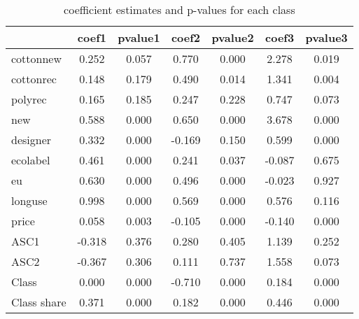 \begin{table}[ht]
\centering
\begin{tabular}{lcccccc}
  \hline
 & coef1 & pvalue1 & coef2 & pvalue2 & coef3 & pvalue3 \\ 
  \hline
cottonnew & 0.252 & 0.057 & 0.770 & 0.000 & 2.278 & 0.019 \\ 
  cottonrec & 0.148 & 0.179 & 0.490 & 0.014 & 1.341 & 0.004 \\ 
  polyrec & 0.165 & 0.185 & 0.247 & 0.228 & 0.747 & 0.073 \\ 
  new & 0.588 & 0.000 & 0.650 & 0.000 & 3.678 & 0.000 \\ 
  designer & 0.332 & 0.000 & -0.169 & 0.150 & 0.599 & 0.000 \\ 
  ecolabel & 0.461 & 0.000 & 0.241 & 0.037 & -0.087 & 0.675 \\ 
  eu & 0.630 & 0.000 & 0.496 & 0.000 & -0.023 & 0.927 \\ 
  longuse & 0.998 & 0.000 & 0.569 & 0.000 & 0.576 & 0.116 \\ 
  price & 0.058 & 0.003 & -0.105 & 0.000 & -0.140 & 0.000 \\ 
  ASC1 & -0.318 & 0.376 & 0.280 & 0.405 & 1.139 & 0.252 \\ 
  ASC2 & -0.367 & 0.306 & 0.111 & 0.737 & 1.558 & 0.073 \\ 
  Class & 0.000 & 0.000 & -0.710 & 0.000 & 0.184 & 0.000 \\ 
  Class share & 0.371 & 0.000 & 0.182 & 0.000 & 0.446 & 0.000 \\ 
   \hline
\end{tabular}
\caption{coefficient estimates and p-values for each class} 
\label{tab:Latentclasses1}
\end{table}
